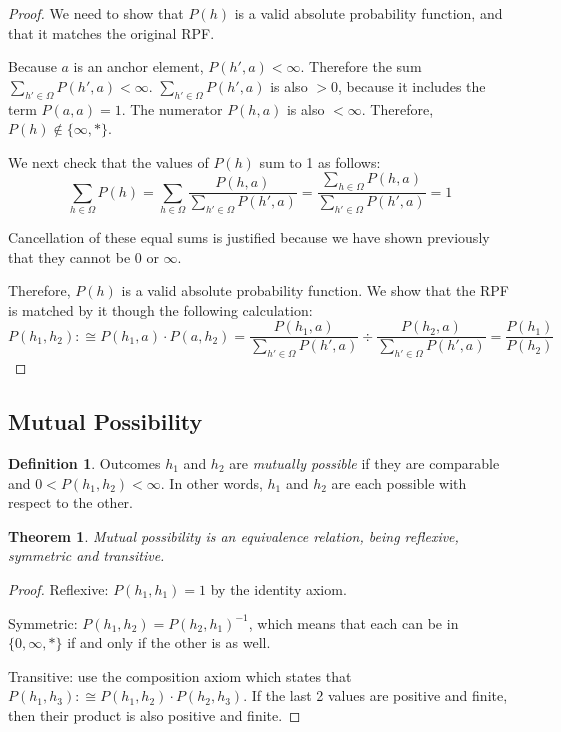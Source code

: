 \documentclass[twoside]{article}
\theoremstyle{plain}%
\newtheorem{theorem}{Theorem}[section]
\theoremstyle{definition}
\newtheorem{definition}{Definition}[section]
\theoremstyle{remark}
\begin{document}
\begin{proof}
We need to show that \(P(h)\) is a valid absolute probability function, and that it matches the original RPF.

Because \(a\) is an anchor element, \(P(h', a) < \infty\). Therefore the sum \(\sum_{h' \in \Omega}P(h', a) < \infty\). \(\sum_{h' \in \Omega}P(h', a)\) is also \(>0\), because it includes the term \(P(a, a) = 1\). The numerator \(P(h, a)\) is also \(< \infty\). Therefore, \(P(h) \notin \{\infty, \ast\}\).

We next check that the values of \(P(h)\) sum to 1 as follows:
\[\sum_{h \in \Omega}P(h) = \sum_{h \in \Omega} \frac{P(h, a)}{\sum_{h' \in \Omega}P(h', a)} = \frac{\sum_{h \in \Omega}P(h, a)}{\sum_{h' \in \Omega}P(h', a)} = 1\]

Cancellation of these equal sums is justified because we have shown previously that they cannot be \(0\) or \(\infty\).

Therefore, \(P(h)\) is a valid absolute probability function. We show that the RPF is matched by it though the following calculation:
\begin{equation}
P(h_1, h_2) :\cong P(h_1, a) \cdot P(a, h_2) = \frac{P(h_1, a)}{\sum_{h' \in \Omega}P(h', a)} \div \frac{P(h_2, a)}{\sum_{h' \in \Omega}P(h', a)} = \frac{P(h_1)}{P(h_2)}
\end{equation}
\end{proof}

\subsection{Mutual Possibility}

\begin{definition}
Outcomes \(h_1\) and \(h_2\) are \textit{mutually possible} if they are comparable and \(0 < P(h_1, h_2) < \infty\). In other words, \(h_1\) and \(h_2\) are each possible with respect to the other.
\end{definition}

\begin{theorem}
Mutual possibility is an \textit{equivalence relation}, being reflexive, symmetric and transitive.
\end{theorem}

\begin{proof}

Reflexive: \(P(h_1, h_1) = 1\) by the identity axiom.

Symmetric: \(P(h_1, h_2) = P(h_2, h_1)^{-1}\), which means that each can be in \(\{0, \infty, \ast\}\) if and only if the other is as well.

Transitive: use the composition axiom which states that \(P(h_1, h_3) :\cong P(h_1, h_2) \cdot P(h_2, h_3)\). If the last 2 values are positive and finite, then their product is also positive and finite.
\end{proof}
\end{document}
